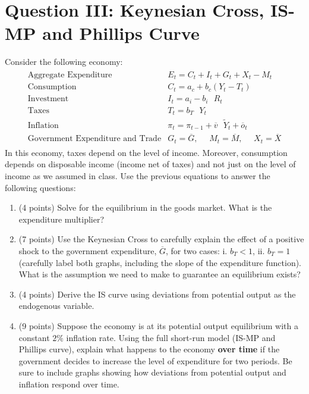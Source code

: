 \documentclass[letterpaper,12pt]{article}
\theoremstyle{dotlessS}
\begin{document}
\section*{Question III: Keynesian Cross, IS-MP and Phillips Curve}
Consider the following economy:
\begin{eqnarray*}
\begin{array}{ll}
\text{Aggregate Expenditure} &E_t=C_t+I_t+G_t+X_t-M_t \\[1.4ex]
\text{Consumption} &C_t=a_c+b_c (Y_t-T_t) \\[1.4ex]
\text{Investment} & I_t=a_i-b_i \: \: \: R_t \\[1.4ex]
\text{Taxes} &T_t=b_T \: \: \: Y_t  \\[1.4ex]
\text{Inflation} &\pi_t=\pi_{t-1}+\overline{v} \: \: \: \widetilde{Y}_t+\overline{o}_t  \\[1.4ex]
\text{Government Expenditure and Trade} & G_t=\overline{G}, \: \: \: \: \: \: M_t=\overline{M}, \: \: \: \: \: \: X_t=\overline{X}
\end{array}
\end{eqnarray*}
In this economy, taxes depend on the level of income. Moreover, consumption depends on disposable income (income net of taxes) and not just on the level of income as we assumed in class. Use the previous equations to answer the following questions:
\begin{enumerate}[label=(\alph*)]
\item (4 points) Solve for the equilibrium in the goods market. What is the expenditure multiplier? 
\item (7 points) Use the Keynesian Cross to carefully explain the effect of a positive shock to the government expenditure, $\overline{G}$, for two cases: i. $b_T<1$, ii. $b_T=1$  (carefully label both graphs, including the slope of the expenditure function).  What is the assumption we need to make to guarantee an equilibrium exists?
\item (4 points) Derive the IS curve using deviations from potential output as the endogenous variable.
\item (9 points) Suppose the economy is at its potential output equilibrium with a constant $2\%$ inflation rate. Using the full short-run model (IS-MP and Phillips curve), explain what happens to the economy \textbf{over time} if the government decides to increase the level of expenditure for two periods. Be sure to include graphs showing how deviations from potential output and inflation respond over time.\\
\end{enumerate}
\end{document}
